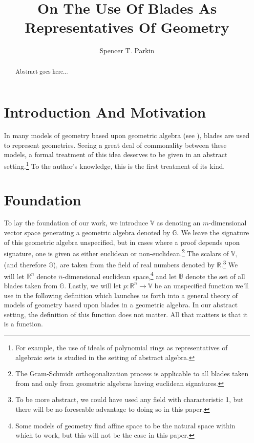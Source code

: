 \documentclass{birkjour}
\theoremstyle{definition}
\theoremstyle{remark}
\numberwithin{equation}{section}
\newcommand{\R}{\mathbb{R}}
\newcommand{\B}{\mathbb{B}}
\newcommand{\G}{\mathbb{G}}
\newcommand{\V}{\mathbb{V}}
\begin{document}
\title{On The Use Of Blades As Representatives Of Geometry}

\author{Spencer T. Parkin}
\address{102 W. 500 S., \\
Salt Lake City, UT  84101} 



\begin{abstract}
Abstract goes here...
\end{abstract}


\maketitle

\section{Introduction And Motivation}

In many models of geometry based upon geometric algebra (see \cite{}), blades are used
to represent geometries.  Seeing a great deal of commonality between these models, a formal
treatment of this idea deserves to be given in an abstract setting.\footnote{For example,
the use of ideals of polynomial rings as representatives of algebraic sets is studied in
the setting of abstract algebra.}  To the author's knowledge, this is the first treatment of its kind.

\section{Foundation}

To lay the foundation of our work, we introduce $\V$ as denoting an $m$-dimensional vector
space generating a geometric algebra denoted by $\G$.  We leave the signature of this geometric algebra
unspecified, but in cases where a proof depends upon signature, one is given as either
euclidean or non-euclidean.\footnote{The Gram-Schmidt orthogonalization process is applicable
to all blades taken from and only from geometric algebras having euclidean signatures.}
The scalars of $\V$, (and therefore $\G$), are taken from the field of real numbers denoted by $\R$.\footnote{To be more abstract,
we could have used any field with characteristic 1, but there will be no foreseable advantage to doing so in this paper.}
We will let $\R^n$ denote $n$-dimensional euclidean space,\footnote{Some models of geometry find affine space to be the natural
space within which to work, but this will not be the case in this paper.} and let $\B$ denote the set of all blades taken from $\G$.
Lastly, we will let $p:\R^n\to\V$ be an unspecified function we'll use in the following definition which launches us forth into a general
theory of models of geometry based upon blades in a geometric algebra.  In our abstract setting, the definition of
this function does not matter.  All that matters is that it is a function.
\end{document}
